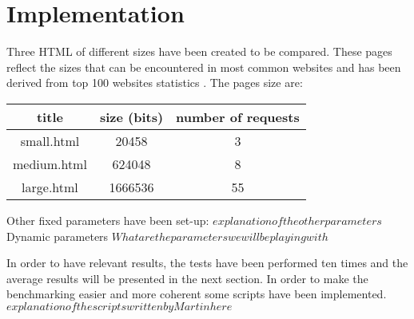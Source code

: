 \section{Implementation}
\label{implementation}
Three HTML of different sizes have been created to be compared. These pages reflect the sizes that can be encountered in most common websites and has been derived from top 100 websites statistics \cite{httparchive}. The pages size are:
\begin{center}
  \begin{tabular}{ | c | c | c | }
    \hline
    title & size (bits) & number of requests \\ \hline \hline
    small.html &  20458 & 3 \\ \hline
    medium.html &  624048 & 8\\ \hline 
    large.html & 1666536 & 55 \\
    \hline
  \end{tabular}
\end{center} 
Other fixed parameters have been set-up:
$explanation of the other parameters $
Dynamic parameters
$What are the parameters we will be playing with$

In order to have relevant results, the tests have been performed ten times and the average results will be presented in the next section. In order to make the benchmarking easier and more coherent some scripts have been implemented.
$explanation of the scripts written by Martin here$

